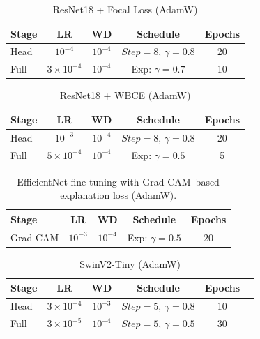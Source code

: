 \documentclass{article}
\begin{document}
\begin{table}[H]
\centering
\begin{tabular}{lcccc}
\toprule
\textbf{Stage} & \textbf{LR} & \textbf{WD} & \textbf{Schedule} & \textbf{Epochs}\\
\midrule
Head
& $10^{-4}$
& $10^{-4}$
& $Step=8$, $\gamma=0.8$
& 20 \\
Full
& $3{\times}10^{-4}$
& $10^{-4}$
& Exp: $\gamma=0.7$
& 10 \\
\bottomrule
\end{tabular}
\caption{ResNet18 + Focal Loss (AdamW)}
\label{tab:resnet_focal_training_schedule}
\end{table}

\begin{table}[H]
\centering
\begin{tabular}{lcccc}
\toprule
\textbf{Stage} & \textbf{LR} & \textbf{WD} & \textbf{Schedule} & \textbf{Epochs}\\
\midrule
Head
& $10^{-3}$
& $10^{-4}$
& $Step=8$, $\gamma=0.8$
& 20 \\
Full
& $5{\times}10^{-4}$
& $10^{-4}$
& Exp: $\gamma{=}0.5$
& 5 \\
\bottomrule
\end{tabular}
\caption{ResNet18 + WBCE (AdamW)}
\label{tab:resnet_wbce_training_schedule}
\end{table}

\begin{table}[H]
\centering
\begin{tabular}{lcccc}
\toprule
\textbf{Stage} & \textbf{LR} & \textbf{WD} & \textbf{Schedule} & \textbf{Epochs} \\
\midrule

Grad-CAM
& $10^{-3}$
& $10^{-4}$
& Exp: $\gamma=0.5$
& 20 \\
\bottomrule
\end{tabular}
\caption{EfficientNet fine-tuning with Grad-CAM–based explanation loss (AdamW).}
\label{tab:efficientnet_gradcam_training}
\end{table}


\begin{table}[H]
\centering
\begin{tabular}{lccccc}
\toprule
\textbf{Stage} & \textbf{LR} & \textbf{WD} & \textbf{Schedule} & \textbf{Epochs} \\
\midrule
Head
& $3{\times}10^{-4}$
& $10^{-3}$
& $Step=5$, $\gamma=0.8$
& 10 \\
Full 
& $3{\times}10^{-5}$
& $10^{-4}$
& $Step=5$, $\gamma=0.5$
& 30 \\
\bottomrule
\end{tabular}
\caption{SwinV2-Tiny (AdamW)}
\label{tab:swin_training_schedule}
\end{table}
\end{document}
